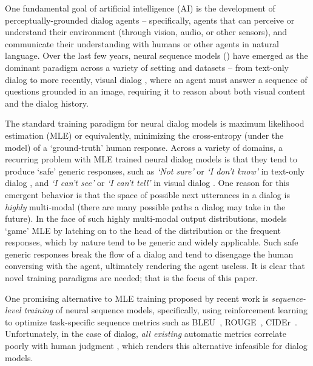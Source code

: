 \documentclass{article}
\newcommand{\myquote}[1]{\emph{`#1'}}
\begin{document}
One fundamental goal of artificial intelligence (AI) is the development of perceptually-grounded dialog agents --
specifically, agents that can perceive or understand their environment (through vision, audio, or other sensors),
and communicate their understanding with humans or other agents in natural language. 
Over the last few years, neural sequence models (\eg \cite{sutskever2014sequence, sordoni2015neural, sukhbaatar2015end}) 
have emerged as the dominant paradigm 
across a variety of setting and datasets -- from text-only dialog \cite{sordoni2015neural, serban2017hierarchical, li2017adversarial, bordes2016learning} to more recently, 
visual dialog \cite{visdial,de2016guesswhat, das2017learning, mostafazadeh2017image, strub2017end},
where an agent must answer a sequence of questions grounded in an image, requiring it to reason about both visual 
content and the dialog history. 



The standard training paradigm for neural dialog models is maximum likelihood estimation (MLE) or equivalently, 
minimizing the cross-entropy (under the model) of a `ground-truth' human response. Across a variety of domains, a recurring problem with MLE trained neural dialog models is that they tend to produce 
`safe' generic responses, such as \myquote{Not sure} or \myquote{I don't know} 
in text-only dialog \cite{li2017adversarial}, and \myquote{I can't see} or \myquote{I can't tell} in visual dialog \cite{visdial,das2017learning}.
One reason for this emergent behavior is that the space of possible next utterances in a dialog is \emph{highly} multi-modal (there are many possible paths a dialog may take in the future). 
In the face of such highly multi-modal output distributions, models `game' MLE by latching on to the head of the distribution or the frequent responses, 
which by nature tend to be generic and widely applicable. 
Such safe generic responses break the flow of a dialog and tend to disengage the human conversing with the agent, 
ultimately rendering the agent useless. It is clear that novel training paradigms are needed; that is the focus of this paper. 



One promising alternative to MLE training proposed by recent work \cite{ranzato2015sequence, liu2016optimization}
is \emph{sequence-level training} of neural sequence models, specifically, using reinforcement learning 
to optimize task-specific sequence metrics such as BLEU~\cite{papineni2002bleu}, ROUGE~\cite{lin2004rouge}, CIDEr~\cite{vedantam2015cider}. Unfortunately, in the case of dialog, \emph{all existing} automatic metrics correlate poorly with human judgment \cite{liu2016not}, which renders this alternative infeasible for dialog models. 
\end{document}
